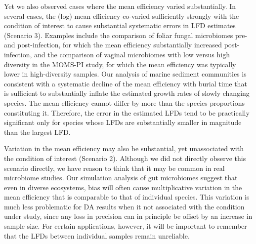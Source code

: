 \documentclass[
]{article}
\begin{document}
Yet we also observed cases where the mean efficiency varied substantially.
In several cases, the (log) mean efficiency co-varied sufficiently strongly with the condition of interest to cause substantial systematic errors in LFD estimates (Scenario 3).
Examples include the comparison of foliar fungal microbiomes pre- and post-infection, for which the mean efficiency substantially increased post-infection, and the comparison of vaginal microbiomes with low versus high diversity in the MOMS-PI study, for which the mean efficiency was typically lower in high-diversity samples.
Our analysis of marine sediment communities is consistent with a systematic decline of the mean efficiency with burial time that is sufficient to substantially inflate the estimated growth rates of slowly changing species.
The mean efficiency cannot differ by more than the species proportions constituting it.
Therefore, the error in the estimated LFDs tend to be practically significant only for species whose LFDs are substantially smaller in magnitude than the largest LFD.

Variation in the mean efficiency may also be substantial, yet unassociated with the condition of interest (Scenario 2).
Although we did not directly observe this scenario directly, we have reason to think that it may be common in real microbiome studies.
Our simulation analysis of gut microbiomes suggest that even in diverse ecosystems, bias will often cause multiplicative variation in the mean efficiency that is comparable to that of individual species.
This variation is much less problematic for DA results when it not associated with the condition under study, since any loss in precision can in principle be offset by an increase in sample size.
For certain applications, however, it will be important to remember that the LFDs between individual samples remain unreliable.
\end{document}
